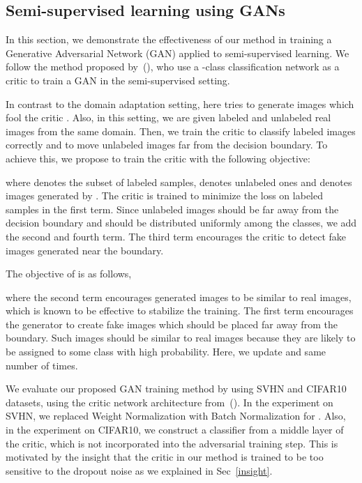 \documentclass{article} \usepackage{iclr2018_conference,times}
\begin{document}
\vspace{-8mm}
\subsection{Semi-supervised learning using GANs}
      
In this section, we demonstrate the effectiveness of our method in training a Generative Adversarial Network (GAN) applied to semi-supervised learning.
We follow the method proposed by~(\cite{springenberg2015unsupervised,salimans2016improved}), who use a -class classification network as a critic to train a GAN in the semi-supervised setting.

 In contrast to the domain adaptation setting, here  tries to generate images which fool the critic . Also, in this setting, we are given labeled and unlabeled real images from the same domain. Then, we train the critic to classify labeled  images correctly and to move unlabeled images far from the decision boundary. To achieve this, we propose to train the critic with the following objective:
\vspace{-3mm}



where  denotes the subset of labeled samples,  denotes unlabeled ones and  denotes  images generated by . The critic is trained to minimize the loss on labeled samples in the first term. Since unlabeled  images should be far away from the decision boundary and  should be distributed uniformly among the classes, we add the second and fourth term. The third term encourages the critic to detect fake images generated near the boundary. 

The objective of  is as follows, 

where the second term encourages generated images to be similar to real images, which is known to be effective to stabilize the training. The first term encourages the generator to create fake images which should be placed far away from the boundary. Such images should be similar to real images because they are likely to be assigned to some class with high probability. 
Here, we update  and  same number of times. 

 We evaluate our proposed GAN training method by using SVHN and CIFAR10 datasets, using the critic network architecture from~(\cite{salimans2016improved}). In the experiment on SVHN, we replaced Weight Normalization with Batch Normalization for . Also, in the experiment on CIFAR10, we construct a classifier from a middle layer of the critic, which is not incorporated into the adversarial training step. This is motivated by the insight that the critic in our method is trained to be too sensitive to the dropout noise as we explained in Sec~\ref{insight}. 
\end{document}
